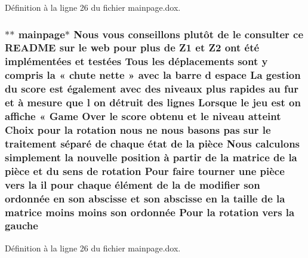 Définition à la ligne 26 du fichier mainpage.\-dox.

\hypertarget{mainpage_8dox_ae1f16ab3d3e60c8a53114050a95e8a06}{
\subsubsection[{gauche}]{\setlength{\rightskip}{0pt plus 5cm}$\ast$$\ast$ mainpage$\ast$ Nous vous conseillons plutô{\bf t} {\bf de} le consulter ce R\-E\-A\-D\-M\-E sur le web pour plus {\bf de} {\bf Z1} et Z2 ont é{\bf t}é implémentées et testées Tous les déplacements sont {\bf y} compris la « chute nette » avec la barre d espace La gestion du score est également avec des niveaux plus rapides au fur et à mesure que l on détruit des lignes Lorsque le jeu est on affiche « Game Over le score obtenu et le niveau atteint Choix pour la rotation nous ne nous basons pas sur le traitement {\bf s}éparé {\bf de} chaque état {\bf de} la pièce Nous calculons simplement la nouvelle position à partir {\bf de} la {\bf matrice} {\bf de} la pièce et du {\bf sens} {\bf de} rotation Pour faire tourner une pièce vers la il pour chaque élément {\bf de} la {\bf de} modifier son ordonnée en son abscisse et son abscisse en la taille {\bf de} la {\bf matrice} moins moins son ordonnée Pour la rotation vers la gauche}}\label{mainpage_8dox_ae1f16ab3d3e60c8a53114050a95e8a06}


Définition à la ligne 26 du fichier mainpage.\-dox.

